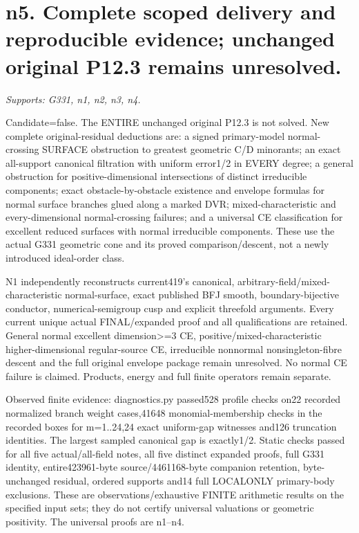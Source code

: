 \section{n5. Complete scoped delivery and reproducible evidence; unchanged original P12.3 remains unresolved.}
\textit{Supports: G331, n1, n2, n3, n4.}

Candidate=false. The ENTIRE unchanged original P12.3 is not solved. New complete original-residual deductions are: a signed primary-model normal-crossing SURFACE obstruction to greatest geometric C/D minorants; an exact all-support canonical filtration with uniform error1/2 in EVERY degree; a general obstruction for positive-dimensional intersections of distinct irreducible components; exact obstacle-by-obstacle existence and envelope formulas for normal surface branches glued along a marked DVR; mixed-characteristic and every-dimensional normal-crossing failures; and a universal CE classification for excellent reduced surfaces with normal irreducible components. These use the actual G331 geometric cone and its proved comparison/descent, not a newly introduced ideal-order class.

N1 independently reconstructs current419's canonical, arbitrary-field/mixed-characteristic normal-surface, exact published BFJ smooth, boundary-bijective conductor, numerical-semigroup cusp and explicit threefold arguments. Every current unique actual FINAL/expanded proof and all qualifications are retained. General normal excellent dimension\textgreater{}=3 CE, positive/mixed-characteristic higher-dimensional regular-source CE, irreducible nonnormal nonsingleton-fibre descent and the full original envelope package remain unresolved. No normal CE failure is claimed. Products, energy and full finite operators remain separate.

Observed finite evidence: diagnostics.py passed528 profile checks on22 recorded normalized branch weight cases,41648 monomial-membership checks in the recorded boxes for m=1..24,24 exact uniform-gap witnesses and126 truncation identities. The largest sampled canonical gap is exactly1/2. Static checks passed for all five actual/all-field notes, all five distinct expanded proofs, full G331 identity, entire423961-byte source/4461168-byte companion retention, byte-unchanged residual, ordered supports and14 full LOCALONLY primary-body exclusions. These are observations/exhaustive FINITE arithmetic results on the specified input sets; they do not certify universal valuations or geometric positivity. The universal proofs are n1--n4.

